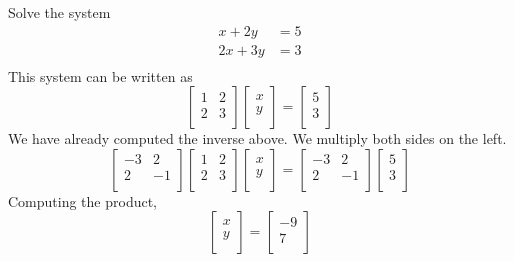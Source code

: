 \documentclass{article}
\begin{document}
\begin{example}
  Solve the system
  \begin{align*}
    x + 2y &= 5\\
    2x + 3y &= 3\\
  \end{align*}
  This system can be written as
  \[
    \begin{bmatrix}
      1 & 2\\
      2 & 3\\
    \end{bmatrix}
    \begin{bmatrix}
      x\\
      y\\
    \end{bmatrix}
    =
    \begin{bmatrix}
      5\\
      3\\
    \end{bmatrix}
  \]
  We have already computed the inverse above. We multiply both sides on the left.
  \[
    \begin{bmatrix}
      -3 & 2\\
      2 & -1\\
    \end{bmatrix}
    \begin{bmatrix}
      1 & 2\\
      2 & 3\\
    \end{bmatrix}
    \begin{bmatrix}
      x\\
      y\\
    \end{bmatrix}
    =
    \begin{bmatrix}
      -3 & 2\\
      2 & -1\\
    \end{bmatrix}
    \begin{bmatrix}
      5\\
      3\\
    \end{bmatrix}
  \]
  Computing the product,
  \[
    \begin{bmatrix}
      x\\
      y\\
    \end{bmatrix}
    =
    \begin{bmatrix}
      -9\\
      7\\
    \end{bmatrix}
  \]
\end{example}
\end{document}
